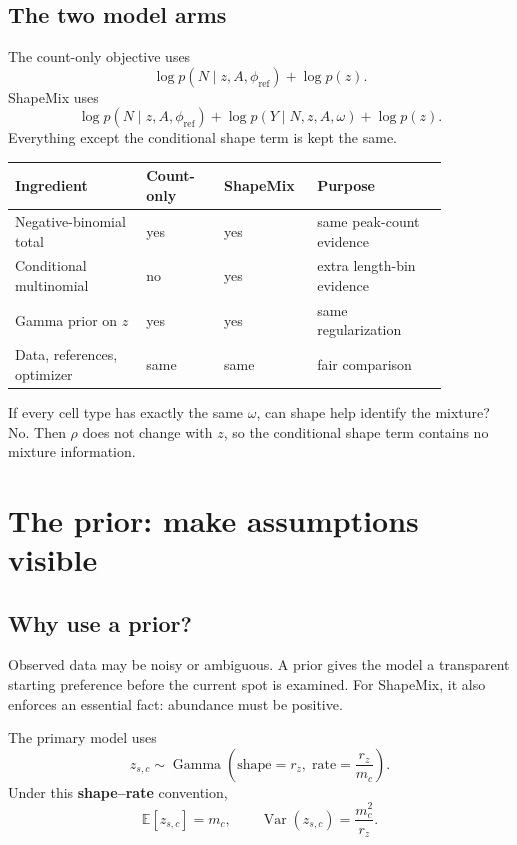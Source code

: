 \documentclass[11pt]{article}
\newcommand{\Gam}{\operatorname{Gamma}}
\newcommand{\E}{\mathbb{E}}
\newcommand{\Var}{\operatorname{Var}}
\newcommand{\term}[1]{\textbf{\color{tealdark}#1}}
\begin{document}
\subsection{The two model arms}

The count-only objective uses
\[
\log p(N\mid z,A,\phi_{\mathrm{ref}})+\log p(z).
\]
ShapeMix uses
\[
\log p(N\mid z,A,\phi_{\mathrm{ref}})
+\log p(Y\mid N,z,A,\omega)
+\log p(z).
\]
Everything except the conditional shape term is kept the same.

\begin{center}
\begin{tabular}{L{0.27\linewidth}C{0.16\linewidth}C{0.16\linewidth}L{0.27\linewidth}}
\toprule
Ingredient & Count-only & ShapeMix & Purpose \\
\midrule
Negative-binomial total & yes & yes & same peak-count evidence \\
Conditional multinomial & no & yes & extra length-bin evidence \\
Gamma prior on \(z\) & yes & yes & same regularization \\
Data, references, optimizer & same & same & fair comparison \\
\bottomrule
\end{tabular}
\end{center}

\begin{checkpoint}
If every cell type has exactly the same \(\omega\), can shape help identify the
mixture? No. Then \(\rho\) does not change with \(z\), so the conditional shape
term contains no mixture information.
\end{checkpoint}

\section{The prior: make assumptions visible}

\subsection{Why use a prior?}

Observed data may be noisy or ambiguous. A prior gives the model a transparent
starting preference before the current spot is examined. For ShapeMix, it also
enforces an essential fact: abundance must be positive.

The primary model uses
\[
\boxed{
z_{s,c}\sim
\Gam\left(
\text{shape}=r_z,\;
\text{rate}=\frac{r_z}{m_c}
\right).
}
\]
Under this \term{shape--rate} convention,
\[
\E[z_{s,c}]=m_c,
\qquad
\Var(z_{s,c})=\frac{m_c^2}{r_z}.
\]
\end{document}
